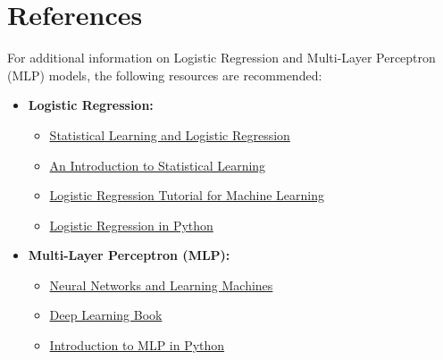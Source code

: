 \documentclass[a4paper,12pt]{article}
\begin{document}
\section{References}

For additional information on Logistic Regression and Multi-Layer Perceptron (MLP) models, the following resources are recommended:

\begin{itemize}
    \item \textbf{Logistic Regression:}
    \begin{itemize}
        \item \href{https://web.stanford.edu/~hastie/Papers/ESLII.pdf}{Statistical Learning and Logistic Regression}
        \item \href{https://www.statlearning.com/}{An Introduction to Statistical Learning}
        \item \href{https://www.datacamp.com/community/tutorials/understanding-logistic-regression-python}{Logistic Regression Tutorial for Machine Learning}
        \item \href{https://scikit-learn.org/stable/modules/linear_model.html#logistic-regression}{Logistic Regression in Python}
    \end{itemize}

    \item \textbf{Multi-Layer Perceptron (MLP):}
    \begin{itemize}
        \item \href{http://www.ece.mcmaster.ca/~haykin/}{Neural Networks and Learning Machines}
        \item \href{https://www.deeplearningbook.org/}{Deep Learning Book}
        \item \href{https://scikit-learn.org/stable/modules/neural_networks_supervised.html}{Introduction to MLP in Python}
    \end{itemize}
\end{itemize}
\end{document}
